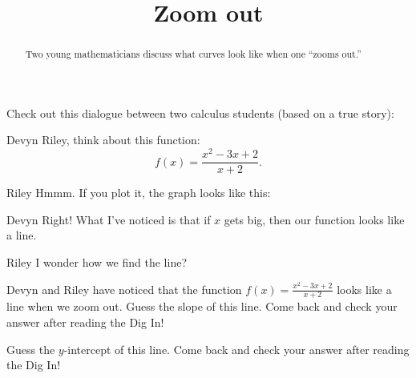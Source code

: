 \documentclass{ximera}
\title[Break-Ground:]{Zoom out}
\begin{document}
\begin{abstract}
Two young mathematicians discuss what curves look like when one
``zooms out.''
\end{abstract}
\maketitle

Check out this dialogue between two calculus students (based on a true
story):

\begin{dialogue}
\item[Devyn] Riley, think about this function:
  \[
  f(x) = \frac{x^2-3x+2}{x+2}.
  \]
\item[Riley] Hmmm. If you plot it, the graph looks like this:
  \begin{image}
  \end{image}
\item[Devyn] Right! What I've noticed is that if $x$ gets big, then
  our function looks like a line.
\item[Riley] I wonder how we find the line? 
\end{dialogue}

\begin{problem}
Devyn and Riley have noticed that the function $f(x) = \frac{x^2 - 3x + 2}{x+2}$ looks like a line when we zoom out.  Guess the slope of this line.  Come back and check your answer after reading the Dig In!
\begin{freeResponse}

\end{freeResponse}
\end{problem}

\begin{problem}
   Guess the $y$-intercept of this line.  Come back and check your answer after reading the Dig In!
   \begin{freeResponse}
   
   \end{freeResponse}
\end{problem}




\end{document}
